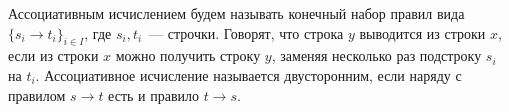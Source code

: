 Ассоциативным исчислением будем называть конечный набор правил вида $\{s_i \to t_i\}_{i \in I}$, где
$s_i, t_i$~--- строчки. Говорят, что строка $y$ выводится из строки $x$, если из строки $x$ можно
получить строку $y$, заменяя несколько раз подстроку $s_i$ на $t_i$. Ассоциативное исчисление называется
двусторонним, если наряду с правилом $s \to t$ есть и правило $t \to s$.